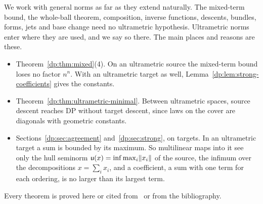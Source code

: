 We work with general norms as far as they extend naturally. The mixed-term bound, the whole-ball theorem, composition, inverse functions, descents, bundles, forms, jets and base change need no ultrametric hypothesis. Ultrametric norms enter where they are used, and we say so there. The main places and reasons are these.
\begin{itemize}
\item Theorem~\ref{dp:thm:mixed}(4). On an ultrametric source the mixed-term bound loses no factor $n^n$. With an ultrametric target as well, Lemma~\ref{dp:lem:strong-coefficients} gives the constants.
\item Theorem~\ref{dp:thm:ultrametric-minimal}. Between ultrametric spaces, source descent reaches DP without target descent, since laws on the cover are diagonals with geometric constants.
\item Sections~\ref{dp:sec:agreement} and~\ref{dp:sec:strong}, on targets. In an ultrametric target a sum is bounded by its maximum. So multilinear maps into it see only the hull seminorm $\mathsf u(x)=\inf\max_i\lVert x_i\rVert$ of the source, the infimum over the decompositions $x=\sum_ix_i$, and a coefficient, a sum with one term for each ordering, is no larger than its largest term.
\end{itemize}
Every theorem is proved here or cited from~\cite{I} or from the bibliography.
